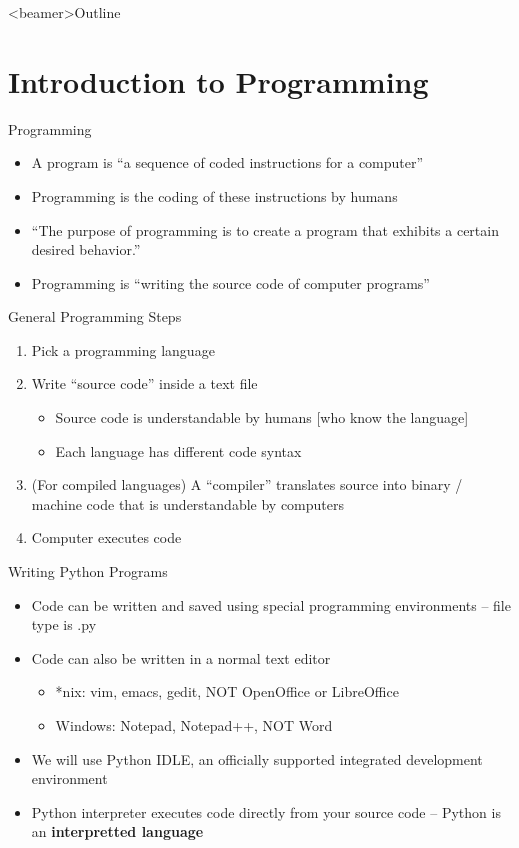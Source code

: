 \begin{frame}<beamer>{Outline}
%  
\tableofcontents
\end{frame}
\section{Introduction to Programming}

\begin{frame}{Programming}
\begin{itemize}
\item A program is ``a sequence of coded instructions for a computer''
\item Programming is the coding of these instructions by humans
\item ``The purpose of programming is to create a program that exhibits a certain desired behavior.''
\item Programming is ``writing the source code of computer programs''
\end{itemize}
\end{frame}

\begin{frame}{General Programming Steps}
\begin{enumerate}
\item Pick a programming language
\item Write ``source code'' inside a text file
\begin{itemize}
\item Source code is understandable by humans [who know the language]
\item Each language has different code syntax
\end{itemize}
\item (For compiled languages) A ``compiler'' translates source into binary / machine code that is understandable by computers
\item Computer executes code
\end{enumerate}
\end{frame}

\begin{frame}{Writing Python Programs}
\begin{itemize}
\item Code can be written and saved using special programming environments -- file type is .py
\item Code can also be written in a normal text editor
\begin{itemize}
\item *nix: vim, emacs, gedit, NOT OpenOffice or LibreOffice
\item Windows: Notepad, Notepad++, NOT Word
\end{itemize}
\item We will use Python IDLE, an officially supported integrated development environment
\item Python interpreter executes code directly from your source code -- Python is an \textbf{interpretted language}
\end{itemize}
\end{frame}

